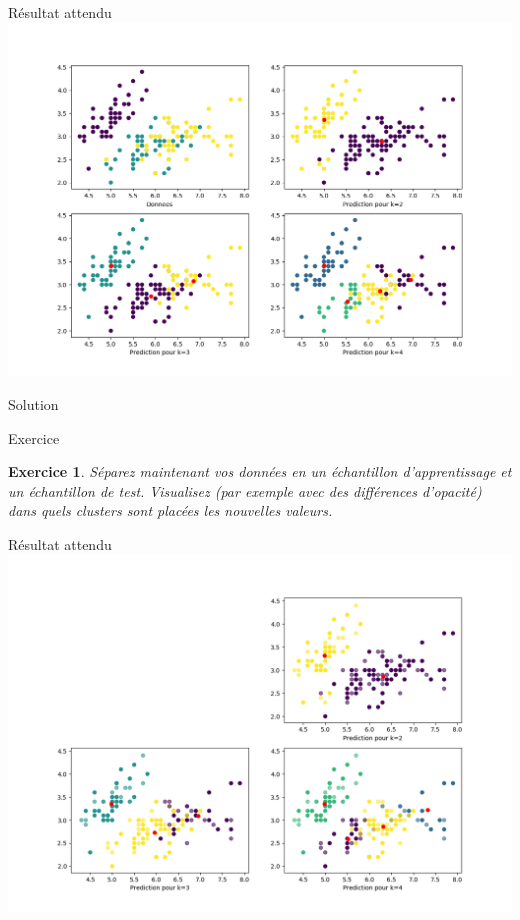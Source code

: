 \documentclass[11pt]{beamer}
\newtheorem{exercice}{Exercice}
\newcommand{\Pythonsmall}[1]{
	{\scriptsize }
}
\begin{document}
\begin{frame}{Résultat attendu}
\includegraphics[scale=0.35]{ex501}
\end{frame}

\begin{frame}{Solution}
\Pythonsmall{ex501}
\end{frame}


\begin{frame}{Exercice}

\begin{exercice}
Séparez maintenant vos données en un échantillon d'apprentissage et un échantillon de test. Visualisez (par exemple avec des différences d'opacité) dans quels clusters sont placées les nouvelles valeurs.
\end{exercice}

\end{frame}

\begin{frame}{Résultat attendu}
\includegraphics[scale=0.35]{ex501bis}
\end{frame}
\end{document}
